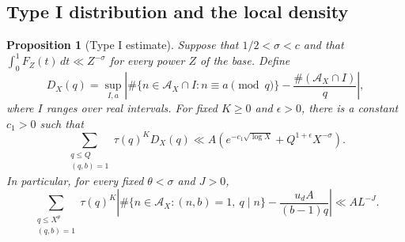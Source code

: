 \documentclass[11pt,a4paper]{article}
\theoremstyle{paperplain}
\newtheorem{proposition}[theorem]{Proposition}
\numberwithin{equation}{section}
\begin{document}
\subsection{Type I distribution and the local density}

\begin{proposition}[Type I estimate]\label{arith:typeI}
Suppose that $1/2<\sigma<c$ and that
$\int_0^1F_Z(t)\,dt\ll Z^{-\sigma}$ for every power $Z$ of the base.
Define
\[
 D_X(q)=\sup_{I,a}\left|
 \#\{n\in\mathcal A_X\cap I:n\equiv a\pmod q\}
 -\frac{\#(\mathcal A_X\cap I)}q\right|,
\]
where $I$ ranges over real intervals. For fixed $K\ge0$ and
$\epsilon>0$, there is a constant $c_1>0$ such that
\begin{equation}\label{arith:typeI-max}
 \sum_{\substack{q\le Q\\(q,b)=1}}\tau(q)^K D_X(q)
 \ll A\left(e^{-c_1\sqrt{\log X}}+
                      Q^{1+\epsilon}X^{-\sigma}\right).
\end{equation}
In particular, for every fixed $\theta<\sigma$ and $J>0$,
\begin{equation}\label{arith:typeI-unit}
 \sum_{\substack{q\le X^\theta\\(q,b)=1}}\tau(q)^K
 \left|\#\{n\in\mathcal A_X:(n,b)=1,\ q\mid n\}
                -\frac{u_d A}{(b-1)q}\right|
 \ll A L^{-J}.
\end{equation}
\end{proposition}
\end{document}
